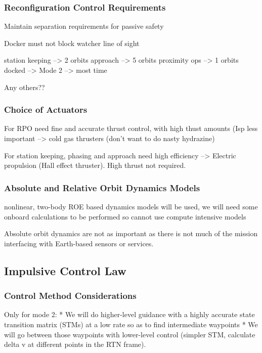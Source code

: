 \subsubsection{Reconfiguration Control Requirements}
Maintain separation requirements for passive safety

Docker must not block watcher line of sight

station keeping --> 2 orbits
approach --> 5 orbits
proximity ops --> 1 orbits
docked --> 
Mode 2 --> most time

Any others??


\subsubsection{Choice of Actuators}
For RPO need fine and accurate thrust control, with high thust amounts (Isp less important --> cold gas thrusters (don't want to do nasty hydrazine)

For station keeping, phasing and approach need high efficiency --> Electric propulsion (Hall effect thruster). High thrust not required.



\subsubsection{Absolute and Relative Orbit Dynamics Models}
nonlinear, two-body ROE based dynamics models will be used, we will need some onboard calculations to be performed so cannot use compute intensive models

Absolute orbit dynamics are not as important as there is not much of the mission interfacing with Earth-based sensors or services. 



\subsection{Impulsive Control Law}

\subsubsection{Control Method Considerations}

Only for mode 2:
* We will do higher-level guidance with a highly accurate state transition matrix (STMs) at a low rate so as to find intermediate waypoints
* We will go between those waypoints with lower-level control (simpler STM, calculate delta v at different points in the RTN frame).

